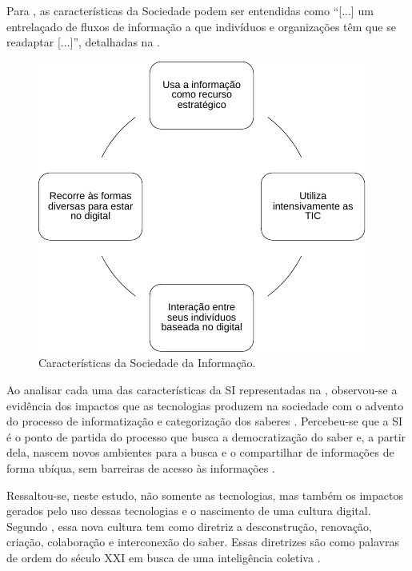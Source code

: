 \documentclass[portuguese]{textolivre}
\begin{document}
Para \textcite[p.~10]{gouveia2004b}, as características da Sociedade podem
ser entendidas como ``{[}...{]} um entrelaçado de fluxos de informação a
que indivíduos e organizações têm que se readaptar {[}...{]}'',
detalhadas na .

\begin{figure}[htbp]
\centering
\begin{minipage}{.5\textwidth} 
  \includegraphics[width=\textwidth]{figura02.pdf}
  \caption{Características da Sociedade da Informação.}
  \label{fig02}
\end{minipage}
\end{figure}

Ao analisar cada uma das características da SI representadas na ,
observou-se a evidência dos impactos que as tecnologias produzem
na sociedade com o advento do processo de informatização e categorização
dos saberes \cite{freitas2015}. Percebeu-se que a SI é o ponto de
partida do processo que busca a democratização do saber e, a partir
dela, nascem novos ambientes para a busca e o compartilhar de
informações de forma ubíqua, sem barreiras de acesso às informações
\cite{levy2011, galvao2017}.

Ressaltou-se, neste estudo, não somente as tecnologias, mas também os
impactos gerados pelo uso dessas tecnologias e o nascimento de uma
cultura digital. Segundo \textcite{abreu2001}, essa nova cultura tem como
diretriz a desconstrução, renovação, criação, colaboração e interconexão
do saber. Essas diretrizes são como palavras de ordem do século XXI em
busca de uma inteligência coletiva \cite{coutinho2011}.
\end{document}
